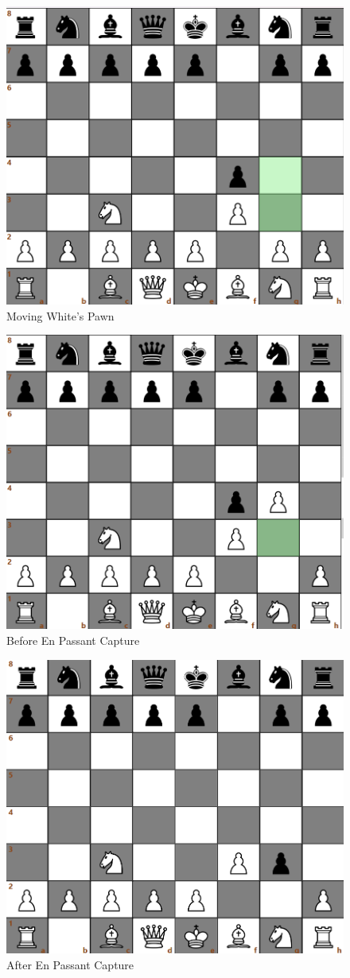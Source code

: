 \documentclass[a4paper,12pt]{article}
\begin{document}
\begin{figure}[H]
    \centering
    \includegraphics[width=0.6\linewidth]{Images/Test Cases/testCase2Img1.png}
    \caption{Moving White's Pawn}
    \label{fig:WhiteMove}
\end{figure}

\begin{figure}[H]
    \centering
    \includegraphics[width=0.6\linewidth]{Images/Test Cases/testCase2Img2.png}
    \caption{Before En Passant Capture}
    \label{fig:BeforeEnPassant}
\end{figure}

\begin{figure}[H]
    \centering
    \includegraphics[width=0.6\linewidth]{Images/Test Cases/testCase2Img3.png}
    \caption{After En Passant Capture}
    \label{fig:AfterEnPassant}
\end{figure}
\end{document}
